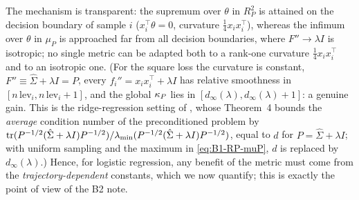 The mechanism is transparent: the supremum over $\theta$ in $R_P^2$ is attained on the decision boundary
of sample $i$ ($x_i^\top\theta=0$, curvature $\frac14x_ix_i^\top$), whereas the infimum over $\theta$ in
$\mu_P$ is approached far from all decision boundaries, where $F''\to\lambda I$ is isotropic; no single
metric can be adapted both to a rank-one curvature $\frac14x_ix_i^\top$ and to an isotropic one. (For the
square loss the curvature is constant, $F''\equiv\hat\Sigma+\lambda I=P$, every $f_i''=x_ix_i^\top+\lambda I$
has relative smoothness in $[n\,\mathrm{lev}_i,n\,\mathrm{lev}_i+1]$, and the global $\kappa_P$ lies in
$[d_\infty(\lambda),d_\infty(\lambda)+1]$: a genuine gain. This is the ridge-regression setting of
\cite{gonen2016solving}, whose Theorem~4 bounds the \emph{average} condition number of the preconditioned
problem by $\operatorname{tr}(P^{-1/2}(\hat\Sigma+\lambda I)P^{-1/2})/\lambda_{\min}(P^{-1/2}(\hat\Sigma+\lambda I)P^{-1/2})$,
equal to $d$ for $P=\hat\Sigma+\lambda I$; with uniform sampling and the maximum in
\eqref{eq:B1-RP-muP}, $d$ is replaced by $d_\infty(\lambda)$.) Hence, for logistic regression, any benefit
of the metric must come from the \emph{trajectory-dependent} constants, which we now quantify; this is
exactly the point of view of the B2 note.

